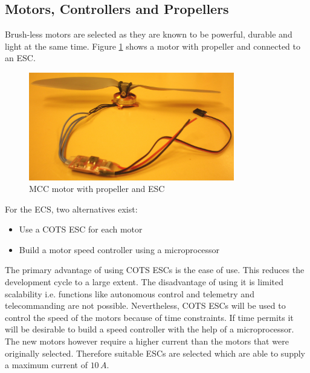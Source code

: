 \subsection{Motors, Controllers and Propellers}
%
Brush-less motors are selected as they are known to be powerful, durable and light at the same time. Figure \ref{fig:Motors} shows a motor with propeller and connected to an \ac{ESC}.
%
\begin{figure}[h]
\centering
\includegraphics[width=0.8\textwidth]{figures/fig_CDR_MCC_motor_with_propeller_esc.jpg}
\caption{MCC motor with propeller and ESC}
\label{fig:Motors}
\end{figure}
%
For the \ac{ECS}, two alternatives exist:
%
\begin{itemize}
\item Use a \ac{COTS} \ac{ESC} for each motor
\item Build a motor speed controller using a microprocessor
\end{itemize}
%
The primary advantage of using \ac{COTS} \ac{ESC}s is the ease of use. This reduces the development cycle to a large extent. The disadvantage of using it is limited scalability i.e. functions like autonomous control and telemetry and telecommanding are not possible. Nevertheless, \ac{COTS} \ac{ESC}s will be used to control the speed of the motors because of time constraints. If time permits it will be desirable to build a speed controller with the help of a microprocessor. The new motors however require a higher current than the motors that were originally selected. Therefore suitable \ac{ESC}s are selected which are able to supply a maximum current of $10\,A$.
%
